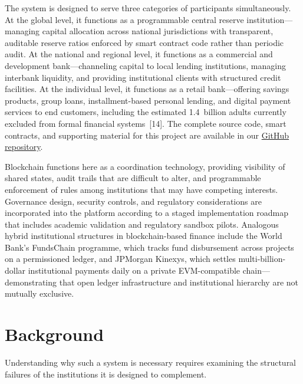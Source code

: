 \documentclass[12pt,a4paper]{report}
\begin{document}
The system is designed to serve three categories of participants simultaneously. At the global level, it functions as a programmable central reserve institution---managing capital allocation across national jurisdictions with transparent, auditable reserve ratios enforced by smart contract code rather than periodic audit. At the national and regional level, it functions as a commercial and development bank---channeling capital to local lending institutions, managing interbank liquidity, and providing institutional clients with structured credit facilities. At the individual level, it functions as a retail bank---offering savings products, group loans, installment-based personal lending, and digital payment services to end customers, including the estimated 1.4~billion adults currently excluded from formal financial systems~[14]. The complete source code, smart contracts, and supporting material for this project are available in our \href{https://github.com/Yuvraajrahman/Cryto-World-Bank}{GitHub repository}.

Blockchain functions here as a coordination technology, providing visibility of shared states, audit trails that are difficult to alter, and programmable enforcement of rules among institutions that may have competing interests. Governance design, security controls, and regulatory considerations are incorporated into the platform according to a staged implementation roadmap that includes academic validation and regulatory sandbox pilots. Analogous hybrid institutional structures in blockchain-based finance include the World Bank's FundsChain programme, which tracks fund disbursement across projects on a permissioned ledger, and JPMorgan Kinexys, which settles multi-billion-dollar institutional payments daily on a private EVM-compatible chain---demonstrating that open ledger infrastructure and institutional hierarchy are not mutually exclusive.

\section{Background}

Understanding why such a system is necessary requires examining the structural failures of the institutions it is designed to complement.
\end{document}
